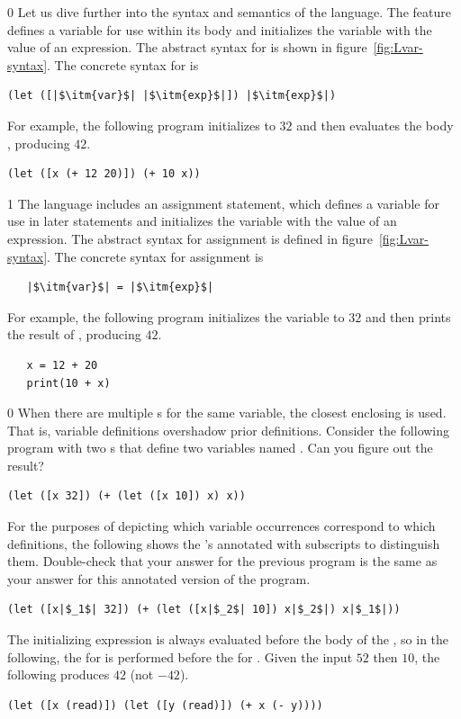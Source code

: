 \documentclass[7x10]{TimesAPriori_MIT}%
\def\racketEd{0}
\def\pythonEd{1}
\providecommand{\BookEdition}{1}
\let\edition\BookEdition
\newcommand{\pythonColor}[0]{}
\numberwithin{theorem}{chapter}
\numberwithin{definition}{chapter}
\numberwithin{equation}{chapter}
\begin{document}
{\if\edition\racketEd
Let us dive further into the syntax and semantics of the \LangVar{}
language.  The  feature defines a variable for use within its
body and initializes the variable with the value of an expression.
The abstract syntax for  is shown in
figure~\ref{fig:Lvar-syntax}.  The concrete syntax for  is
\begin{lstlisting}
(let ([|$\itm{var}$| |$\itm{exp}$|]) |$\itm{exp}$|)
\end{lstlisting}
For example, the following program initializes  to $32$ and then
evaluates the body , producing $42$.
\begin{lstlisting}
(let ([x (+ 12 20)]) (+ 10 x))
\end{lstlisting}
\fi}
%
{\if\edition\pythonEd\pythonColor
%
The \LangVar{} language includes an assignment statement, which defines a
variable for use in later statements and initializes the variable with
the value of an expression.  The abstract syntax for assignment is
defined in figure~\ref{fig:Lvar-syntax}.  The concrete syntax for
assignment is 
\begin{lstlisting}
   |$\itm{var}$| = |$\itm{exp}$|
\end{lstlisting}
For example, the following program initializes the variable 
to $32$ and then prints the result of , producing $42$.
\begin{lstlisting}
   x = 12 + 20
   print(10 + x)
\end{lstlisting}
\fi}

{\if\edition\racketEd
%  
When there are multiple s for the same variable, the closest
enclosing  is used. That is, variable definitions overshadow
prior definitions. Consider the following program with two s
that define two variables named . Can you figure out the
result?
\begin{lstlisting}
(let ([x 32]) (+ (let ([x 10]) x) x))
\end{lstlisting}
For the purposes of depicting which variable occurrences correspond to
which definitions, the following shows the 's annotated with
subscripts to distinguish them. Double-check that your answer for the
previous program is the same as your answer for this annotated version
of the program.
\begin{lstlisting}
(let ([x|$_1$| 32]) (+ (let ([x|$_2$| 10]) x|$_2$|) x|$_1$|))
\end{lstlisting}
The initializing expression is always evaluated before the body of the
, so in the following, the  for  is
performed before the  for . Given the input
$52$ then $10$, the following produces $42$ (not $-42$).
\begin{lstlisting}
(let ([x (read)]) (let ([y (read)]) (+ x (- y))))
\end{lstlisting}
\fi}
\end{document}
